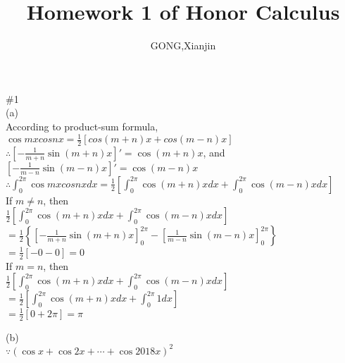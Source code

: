 \documentclass{article}
\author{GONG,Xianjin}
\title{Homework 1 of Honor Calculus}
\begin{document}
\maketitle

\textcolor[rgb]{0.00,0.00,0.50}{\#1}\\

(a)\\

According to product-sum formula,\\

$\displaystyle\cos{mx}cos{nx}=\frac{1}{2}[cos(m+n)x+cos(m-n)x]$\\

$\therefore$\qquad$\displaystyle\left[-\frac{1}{m+n}\sin{(m+n)x}\right]'=\cos{(m+n)x}$, and $\displaystyle\left[-\frac{1}{m-n}\sin{(m-n)x}\right]'=\cos{(m-n)x}$\\

$\therefore$\qquad$\displaystyle\int_{0}^{2\pi}\cos{mx}cos{nx}dx=\frac{1}{2}\left[\int_{0}^{2\pi}\cos{(m+n)x}dx+\int_{0}^{2\pi}\cos{(m-n)x}dx\right]$\\

If $m\neq n$, then\\

\quad$\displaystyle\frac{1}{2}\left[\int_{0}^{2\pi}\cos{(m+n)x}dx+\int_{0}^{2\pi}\cos{(m-n)x}dx\right]$\\

$\displaystyle=\frac{1}{2}\left\{\left[-\frac{1}{m+n}\sin{(m+n)x}\right]_{0}^{2\pi}-\left[\frac{1}{m-n}\sin{(m-n)x}\right]_{0}^{2\pi}\right\}$\\

$\displaystyle=\frac{1}{2}[-0-0]=0$\\

If $m=n$, then\\

\quad$\displaystyle\frac{1}{2}\left[\int_{0}^{2\pi}\cos{(m+n)x}dx+\int_{0}^{2\pi}\cos{(m-n)x}dx\right]$\\

$\displaystyle=\frac{1}{2}\left[\int_{0}^{2\pi}\cos{(m+n)x}dx+\int_{0}^{2\pi}1dx\right]$\\

$\displaystyle=\frac{1}{2}[0+2\pi]=\pi$\\

\vspace{0.5cm}

(b)\\

$\because$\qquad$(\cos{x}+\cos{2x}+\cdots+\cos{2018x})^2$\\
\end{document}
